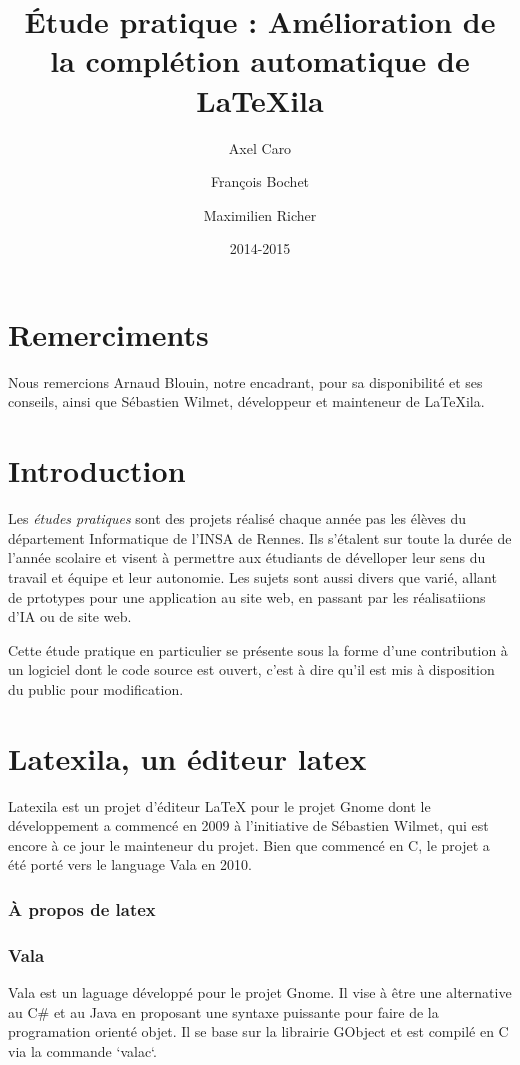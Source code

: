 \documentclass[a4paper,11pt]{report}
\title{Étude pratique : Amélioration de la complétion automatique de LaTeXila}
\author{Axel Caro\and François Bochet\and Maximilien Richer}
\date{2014-2015}
\begin{document}
\maketitle %
\tableofcontents %

\section{Remerciments} %
\label{cha:remerciments}
Nous remercions Arnaud Blouin, notre encadrant, pour sa disponibilité et ses conseils, ainsi que Sébastien Wilmet, développeur et mainteneur de LaTeXila.

\section{Introduction}
\label{cha:Introduction}
Les \textit{études pratiques} sont des projets réalisé chaque année pas les élèves du département Informatique de l'INSA de Rennes. Ils s'étalent sur toute la durée de l'année scolaire et visent à permettre aux étudiants de dévelloper leur sens du travail et équipe et leur autonomie. Les sujets sont aussi divers que varié, allant de prtotypes pour une application au site web, en passant par les réalisatiions d'IA ou de site web.

Cette étude pratique en particulier se présente sous la forme d'une contribution à un logiciel dont le code source est ouvert, c'est à dire qu'il est mis à disposition du public pour modification.

\section{Latexila, un éditeur latex}
\label{sec:latexila}
Latexila est un projet d'éditeur LaTeX pour le projet Gnome dont le développement a commencé en 2009 à l'initiative de Sébastien Wilmet, qui est encore à ce jour le mainteneur du projet. Bien que commencé en C, le projet a été porté vers le language Vala en 2010. 

\subsubsection{À propos de latex}

\subsubsection{Vala}
Vala est un laguage développé pour le projet Gnome. Il vise à être une alternative au C\# et au Java en proposant une syntaxe puissante pour faire de la programation orienté objet. Il se base sur la librairie GObject et est compilé en C via la commande `valac`.
\end{document}
